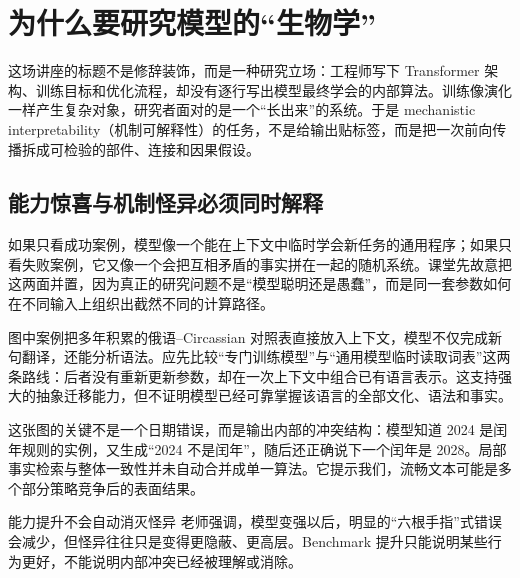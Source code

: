 \section{为什么要研究模型的“生物学”}

这场讲座的标题不是修辞装饰，而是一种研究立场：工程师写下 Transformer 架构、训练目标和优化流程，却没有逐行写出模型最终学会的内部算法。训练像演化一样产生复杂对象，研究者面对的是一个“长出来”的系统。于是 mechanistic interpretability（机制可解释性）的任务，不是给输出贴标签，而是把一次前向传播拆成可检验的部件、连接和因果假设。



\subsection{能力惊喜与机制怪异必须同时解释}

如果只看成功案例，模型像一个能在上下文中临时学会新任务的通用程序；如果只看失败案例，它又像一个会把互相矛盾的事实拼在一起的随机系统。课堂先故意把这两面并置，因为真正的研究问题不是“模型聪明还是愚蠢”，而是同一套参数如何在不同输入上组织出截然不同的计算路径。


图中案例把多年积累的俄语--Circassian 对照表直接放入上下文，模型不仅完成新句翻译，还能分析语法。应先比较“专门训练模型”与“通用模型临时读取词表”这两条路线：后者没有重新更新参数，却在一次上下文中组合已有语言表示。这支持强大的抽象迁移能力，但不证明模型已经可靠掌握该语言的全部文化、语法和事实。


这张图的关键不是一个日期错误，而是输出内部的冲突结构：模型知道 2024 是闰年规则的实例，又生成“2024 不是闰年”，随后还正确说下一个闰年是 2028。局部事实检索与整体一致性并未自动合并成单一算法。它提示我们，流畅文本可能是多个部分策略竞争后的表面结果。

\begin{warningbox}{能力提升不会自动消灭怪异}
老师强调，模型变强以后，明显的“六根手指”式错误会减少，但怪异往往只是变得更隐蔽、更高层。Benchmark 提升只能说明某些行为更好，不能说明内部冲突已经被理解或消除。
\end{warningbox}

